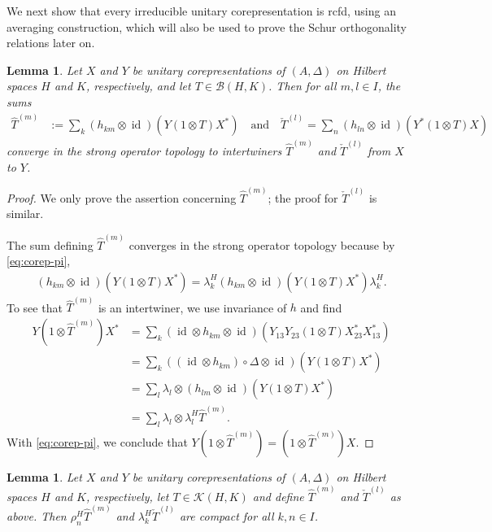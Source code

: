 \documentclass[11pt]{article}
\DeclareMathOperator{\id}{id}
\newtheorem{Lem}[Theorem]{Lemma}
\newtheorem{Cor}[Theorem]{Corollary}
\theoremstyle{definition}
\numberwithin{equation}{section}
\begin{document}
We next show that every irreducible unitary corepresentation
is rcfd, using an averaging construction, which
will also be used to prove the Schur orthogonality relations later on.
\begin{Lem} \label{lem:intertwiner-averaged}
  Let $X$ and $Y$ be unitary corepresentations of $(A,\Delta)$ on Hilbert spaces $H$ and $K$,
  respectively, and let $T \in \mathcal{B}(H,K)$. Then for all $m,l \in I$, the sums
  \begin{align*}
    \hat T^{(m)} &:= \sum_{k} (h_{km} \otimes \id)(Y(1 \otimes T)X^{*}) \quad \text{and} \quad
    \check T^{(l)}=\sum_{n} (h_{ln}\otimes \id)(Y^{*}(1 \otimes T)X)
  \end{align*}
  converge in the strong operator topology to intertwiners $\hat
  T^{(m)}$ and $\check T^{(l)}$ from $X$ to $Y$.
\end{Lem}
\begin{proof}
  We only prove the assertion concerning $\hat T^{(m)}$; the proof for $\check T^{(l)}$ is similar.
  
  The sum defining $\hat T^{(m)}$ converges in the strong operator topology because by
  \eqref{eq:corep-pi},
  \begin{align*}
    (h_{km} \otimes \id)(Y(1 \otimes T)X^{*}) = \lambda^{H}_{k}
    (h_{km} \otimes \id)(Y(1 \otimes T)X^{*}) \lambda^{H}_{k}.
  \end{align*}
  To see that $\hat T^{(m)}$ is an intertwiner, we use invariance of $h$ and find
  \begin{align*}
    Y(1 \otimes \hat T^{(m)})X^{*} &=
    \sum_{k} (\id \otimes h_{km} \otimes \id)(Y_{13}Y_{23}(1 \otimes T)X^{*}_{23}X^{*}_{13}) \\
    &= \sum_{k} ((\id \otimes h_{km})\circ \Delta \otimes \id)(Y(1 \otimes T)X^{*}) \\
    &=\sum_{l} \lambda_{l} \otimes (h_{lm} \otimes \id)(Y(1\otimes T)X^{*}) \\
    &= \sum_{l} \lambda_{l}   \otimes \lambda^{H}_{l} \hat T^{(m)}.
  \end{align*}%
  With \eqref{eq:corep-pi}, we conclude that $Y(1\otimes \hat T^{(m)})
  = (1 \otimes \hat T^{(m)})X$.
\end{proof} 
\begin{Lem} \label{lem:intertwiner-compact} Let $X$ and $Y$ be unitary corepresentations of
  $(A,\Delta)$ on Hilbert spaces $H$ and $K$, respectively, let $T \in \mathcal{K}(H,K)$ and define
  $\hat T^{(m)}$ and $\check T^{(l)}$ as above. Then $\rho^{H}_{n}\hat T^{(m)}$ and
  $\lambda^{H}_{k}\check T^{(l)}$ are compact for all $k,n\in I$.
\end{Lem}
\end{document}
